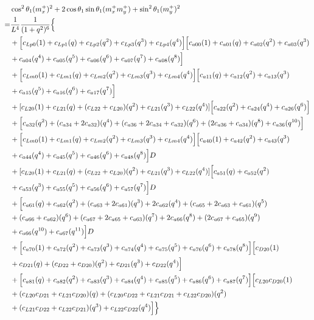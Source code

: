 \documentclass[12pt]{article}
\begin{document}
\begin{align}
    &\cos^2\theta_1(m_x^+)^2  + 2\cos\theta_1\sin\theta_1(m_x^+m_y^+)  +\sin^2\theta_1(m_y^+)^2 \\
    =& \frac{1}{L^4} \frac{1}{(1+q^2)^6} \Bigl\{ \nonumber\\
    &+ \Bigl[ c_{Lp0}(1) +  c_{Lp1}(q) + c_{Lp2}(q^2) + c_{Lp3}(q^3) + c_{Lp4}(q^4)  \Bigr]\Bigl[ c_{a00}(1) + c_{a01}(q) + c_{a02}(q^2) + c_{a03}(q^3) \nonumber\\
    &+ c_{a04}(q^4) + c_{a05}(q^5) + c_{a06}(q^6) + c_{a07}(q^7) +c_{a08}(q^8)  \Bigr] \nonumber\\
    &+ \Bigl[ c_{Lm0}(1) + c_{Lm1}(q)  + c_{Lm2}(q^2) + c_{Lm3}(q^3) + c_{Lm4}(q^4)  \Bigr]\Bigl[ c_{a11}(q) + c_{a12}(q^2) + c_{a13}(q^3) \nonumber\\
    &+ c_{a15}(q^5) + c_{a16}(q^6) + c_{a17}(q^7) \Bigr] \nonumber\\
    &+ [ c_{L20}(1) + c_{L21}(q)  + (c_{L22} +  c_{L20})(q^2) + c_{L21}(q^3)  + c_{L22}(q^4)]\Bigl[ c_{a22}(q^2) + c_{a24}(q^4)+ c_{a26}(q^6) \Bigr] \nonumber\\
    &+ \Bigl[ c_{a32}(q^2) + (c_{a34} + 2c_{a32})(q^4) + (c_{a36} + 2c_{a34}+ c_{a32})(q^6) + (2c_{a36} + c_{a34})(q^8) +  c_{a36}(q^{10}) \Bigr]\nonumber\\
    &+ \Bigl[ c_{Lm0}(1) + c_{Lm1}(q)  + c_{Lm2}(q^2) + c_{Lm3}(q^3) + c_{Lm4}(q^4)  \Bigr]\Bigl[ c_{a40}(1) + c_{a42}(q^2) + c_{a43}(q^3) \nonumber\\
    &+ c_{a44}(q^4) + c_{a45}(q^5) + c_{a46}(q^6) + c_{a48}(q^8)   \Bigr]D \nonumber\\
    &+ [ c_{L20}(1) + c_{L21}(q)  + (c_{L22} +  c_{L20})(q^2) + c_{L21}(q^3)  + c_{L22}(q^4)]\Bigl[ c_{a51}(q) + c_{a52}(q^2) \nonumber\\
    &+  c_{a53}(q^3) + c_{a55}(q^5) + c_{a56}(q^6)+  c_{a57}(q^7) \Bigr]D \nonumber\\
    &+ \Bigl[  c_{a61}(q)  + c_{a62}(q^2) +  (c_{a63} + 2c_{a61})(q^3) + 2c_{a62}(q^4) +(c_{a65} + 2c_{a63} + c_{a61})(q^5) \nonumber\\
    &+ (c_{a66} + c_{a62})(q^6) +(c_{a67} + 2c_{a65} + c_{a63})(q^7) +  2c_{a66}(q^8) +(2c_{a67} + c_{a65})(q^9) \nonumber\\
    &+  c_{a66}(q^{10}) +c_{a67}(q^{11})  \Bigr]D \nonumber\\
    &+ \Bigl[ c_{a70}(1) + c_{a72}(q^2) + c_{a73}(q^3) + c_{a74}(q^4) + c_{a75}(q^5) +  c_{a76}(q^6) + c_{a78}(q^8) \Bigr]\Bigl[ c_{D20}(1) \nonumber\\
    &+ c_{D21}(q) + (c_{D22} + c_{D20})(q^2) + c_{D21}(q^3) + c_{D22}(q^4)\Bigr] \nonumber\\
    &+ \Bigl[ c_{a81}(q) + c_{a82}(q^2) + c_{a83}(q^3) + c_{a84}(q^4) + c_{a85}(q^5) + c_{a86}(q^6) + c_{a87}(q^7) \Bigr] \Bigl[  c_{L20}c_{D20}(1) \nonumber\\
    &+ (c_{L20}c_{D21} + c_{L21}c_{D20})(q) + (c_{L20}c_{D22} + c_{L21}c_{D21} + c_{L22}c_{D20})(q^2) \nonumber\\
    &+ (c_{L21}c_{D22} + c_{L22}c_{D21})(q^3) +  c_{L22}c_{D22}(q^4) \Bigr] \Bigr\}
\end{align}
\end{document}
